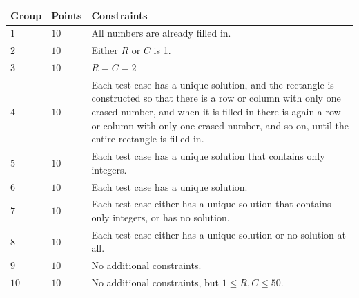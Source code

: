 \noindent
\begin{tabular}{| l | l | p{12cm} |}
  \hline
  \textbf{Group} & \textbf{Points} & \textbf{Constraints} \\ \hline
  $1$    & $10$         & All numbers are already filled in.  \\ \hline
  $2$    & $10$         & Either $R$ or $C$ is 1. \\ \hline
  $3$    & $10$         & $R = C = 2$ \\ \hline
  $4$    & $10$         & Each test case has a unique solution, and the rectangle is constructed so that there is a row or column with only one erased number, and when it is filled in there is again a row or column with only one erased number, and so on, until the entire rectangle is filled in.  \\ \hline
  $5$    & $10$         & Each test case has a unique solution that contains only integers. \\ \hline
  $6$    & $10$         & Each test case has a unique solution. \\ \hline
  $7$    & $10$         & Each test case either has a unique solution that contains only integers, or has no solution. \\ \hline
  $8$    & $10$         & Each test case either has a unique solution or no solution at all. \\ \hline
  $9$    & $10$         & No additional constraints. \\ \hline
  $10$    & $10$         & No additional constraints, but $1 \le R, C \le 50$. \\ \hline

\end{tabular}
